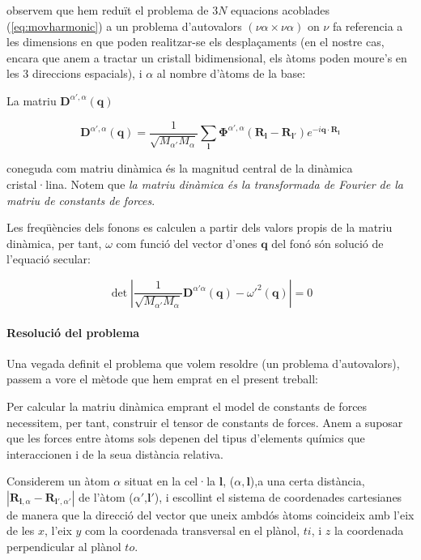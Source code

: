 \documentclass[12pt]{article} %
\let\vec\mathbf %
\begin{document}
observem que hem reduït el problema de $3N$ equacions acoblades (\ref{eq:movharmonic})
a un problema d'autovalors $(\nu\alpha\times\nu\alpha)$ on $\nu$ fa referencia a les dimensions en que poden realitzar-se els desplaçaments (en el nostre cas, encara que anem a tractar un cristall bidimensional, els àtoms poden moure's en les $3$ direccions espacials), i $\alpha$ al nombre d'àtoms de la base:

La matriu $\mathbf D^{\alpha',\alpha}(\vec q)$

\begin{equation}
 \label{eq:matriu_dinàmica}
 \boxed{
 \vec D^{\alpha',\alpha}(\vec q)=\frac{1}{\sqrt{M_{\alpha'} M_{\alpha}}}\sum_\vec l\vec\Phi^{\alpha',\alpha}\left(\vec R_\vec l-\vec R_{\vec l'}\right)e^{-i\vec q\cdot\vec R_\vec l}}
\end{equation}

coneguda com matriu dinàmica és la magnitud central de la dinàmica cristal·lina. Notem que \textit{la matriu dinàmica és la transformada de Fourier de la matriu de constants de forces}.

Les freqüències dels fonons es calculen a partir dels valors propis de la matriu dinàmica, per tant, $\omega$ com funció del vector d'ones $\vec q$ del fonó són solució de l'equació secular:

\begin{equation}
\label{eq:secular}
\det\left|\frac{1}{\sqrt{M_{\alpha'} M_{\alpha}}}\vec D^{\alpha'\alpha}\left(\vec q\right)-{\omega'}^2\left(\vec q\right)\right|=0 
\end{equation}


\paragraph{Resolució del problema}
Una vegada definit el problema que volem resoldre (un problema d'autovalors), passem a vore el mètode que hem emprat en el present treball:

Per calcular la matriu dinàmica emprant el model de constants de forces necessitem, per tant, construir el tensor de constants de forces. Anem a suposar que les forces entre àtoms sols depenen del tipus d'elements químics que interaccionen i de la seua distància relativa.

Considerem un àtom $\alpha$ situat en la cel·la $\vec l$, ($\alpha, \vec l$),a una certa distància, $|\vec R_{\vec l,\alpha}-\vec R_{\vec{l'},\alpha'}|$ de l'àtom  ($\alpha'$,$\vec l'$), i escollint el sistema de coordenades cartesianes de manera que la direcció del vector que uneix ambdós àtoms coincideix amb l'eix de les $x$, l'eix $y$ com la coordenada transversal en el plànol, $ti$, i $z$ la coordenada perpendicular al plànol $to$.
\end{document}
